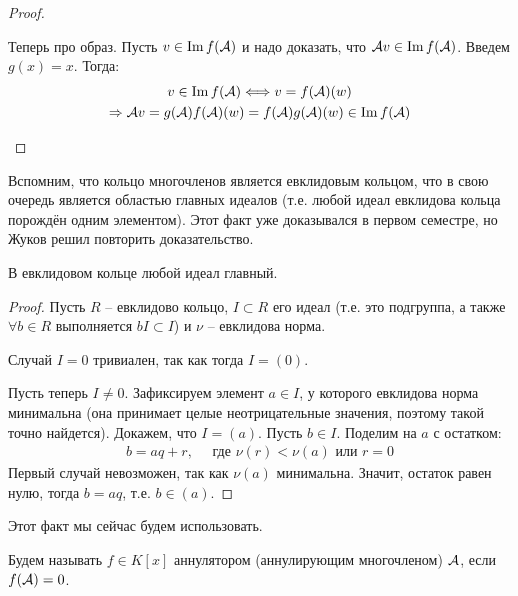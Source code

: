 {\begin{theorem}
\begin{proof}
\begin{enumerate}
        Теперь про образ. Пусть $v \in \operatorname{Im} f(\mathcal{A})$ и надо доказать, что $\mathcal{A} v \in \operatorname{Im} f(\mathcal{A})$.
        Введем $g(x) = x$. Тогда: \begin{gather*}
            v \in \operatorname{Im} f(\mathcal{A}) \Longleftrightarrow v = f(\mathcal{A}) (w) \\
            \Rightarrow \mathcal{A} v = g(\mathcal{A}) f(\mathcal{A}) (w) = f(\mathcal{A}) g(\mathcal{A}) (w) \in \operatorname{Im} f(\mathcal{A})
        \end{gather*}
    \end{enumerate}
    \end{proof}
\end{theorem}

Вспомним, что кольцо многочленов является евклидовым кольцом, что в свою очередь является областью главных идеалов (т.е. любой идеал евклидова кольца порождён одним элементом). 
Этот факт уже доказывался в первом семестре, но Жуков решил повторить доказательство. 

\begin{lemma}
    В евклидовом кольце любой идеал главный.

    \begin{proof}
    Пусть $R$ -- евклидово кольцо, $I \subset R$ его идеал (т.е. это подгруппа, а также $\forall b \in R$ выполняется $bI \subset I$) и $\nu$ -- евклидова норма.
    
    \quad Случай $I = 0$ тривиален, так как тогда $I = (0)$.

    \quad Пусть теперь $I \neq 0$. 
    Зафиксируем элемент $a \in I$, у которого евклидова норма минимальна (она принимает целые неотрицательные значения, поэтому такой точно найдется).
    Докажем, что $I = (a)$. Пусть $ b \in I$. Поделим на $a$ с остатком:
    \begin{gather*}
        b = aq + r, \quad \text{ где } \nu(r) < \nu(a) \text{ или } r = 0
    \end{gather*}
    \quad Первый случай невозможен, так как $ \nu(a) $ минимальна. 
    Значит, остаток равен нулю, тогда $b = aq$, т.е. $b \in (a)$.
    \end{proof}
\end{lemma}

\vspace*{3mm}

Этот факт мы сейчас будем использовать.

\vspace*{3mm}

\begin{conj} 
    Будем называть $f \in K[x]$ аннулятором (аннулирующим многочленом) $\mathcal{A}$, если $f(\mathcal{A}) = 0$.
\end{conj}

}
